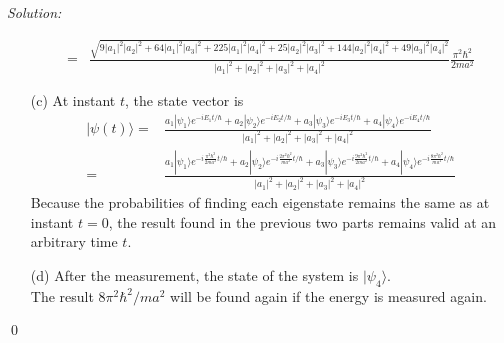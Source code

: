 \documentclass[12pt,a4paper]{article}
\newenvironment{sol}
    {\emph{Solution:}
    }
    {
    \qed
    }
\begin{document}
\begin{sol}
\begin{itemize}
\begin{align}
=&\frac{\sqrt{9|a_1|^2|a_2|^2+64|a_1|^2|a_3|^2+225|a_1|^2|a_4|^2+25|a_2|^2|a_3|^2+144|a_2|^2|a_4|^2+49|a_3|^2|a_4|^2}}{|a_1|^2+|a_2|^2+|a_3|^2+|a_4|^2}\frac{\pi^2\hbar^2}{2ma^2}
\end{align}\normalsize
\item[(c)] At instant $t$, the state vector is
\begin{align}
\nonumber|\psi(t)\rangle=&\frac{a_1|\psi_1\rangle e^{-iE_1t/\hbar}+a_2|\psi_2\rangle e^{-iE_2t/\hbar}+a_3|\psi_3\rangle e^{-iE_3t/\hbar}+a_4|\psi_4\rangle e^{-iE_4t/\hbar}}{|a_1|^2+|a_2|^2+|a_3|^2+|a_4|^2}\\
=&\frac{a_1|\psi_1\rangle e^{-i\frac{\pi^2\hbar^2}{2ma^2}t/\hbar}+a_2|\psi_2\rangle e^{-i\frac{2\pi^2\hbar^2}{ma^2}t/\hbar}+a_3|\psi_3\rangle e^{-i\frac{9\pi^2\hbar^2}{2ma^2}t/\hbar}+a_4|\psi_4\rangle e^{-i\frac{8\pi^2\hbar^2}{ma^2}t/\hbar}}{|a_1|^2+|a_2|^2+|a_3|^2+|a_4|^2}
\end{align}
Because the probabilities of finding each eigenstate remains the same as at instant $t=0$, the result found in the previous two parts remains valid at an arbitrary time $t$.
\item[(d)] After the measurement, the state of the system is $|\psi_4\rangle$.\\
The result $8\pi^2\hbar^2/ma^2$ will be found again if the energy is measured again.
\end{itemize}
\end{sol}
\end{document}
